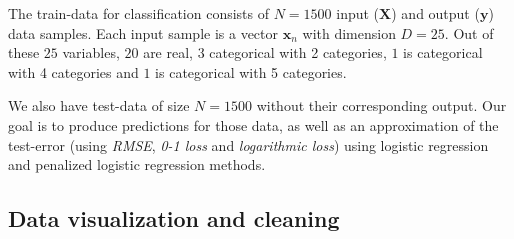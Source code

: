 \documentclass{article} %
\begin{document}
The train-data for classification consists of $N = 1500$ input ($\mathbf{X}$) and output ($\mathbf{y}$) data samples. Each input sample is a vector $\mathbf{x}_n$ with dimension $D = 25$. Out of these $25$ variables, $20$ are real, $3$ categorical with 2 categories, $1$ is categorical with 4 categories and $1$ is categorical with 5 categories.

We also have test-data of size $N=1500$ without their corresponding output. Our goal is to produce predictions for those data, as well as an approximation of the test-error (using \textit{RMSE}, \textit{0-1 loss} and \textit{logarithmic loss}) using logistic regression and penalized logistic regression methods.

\subsection{Data visualization and cleaning}
\begin{figure}
\center
{}
\hfill
{}
\caption{}
\end{figure}
\end{document}
